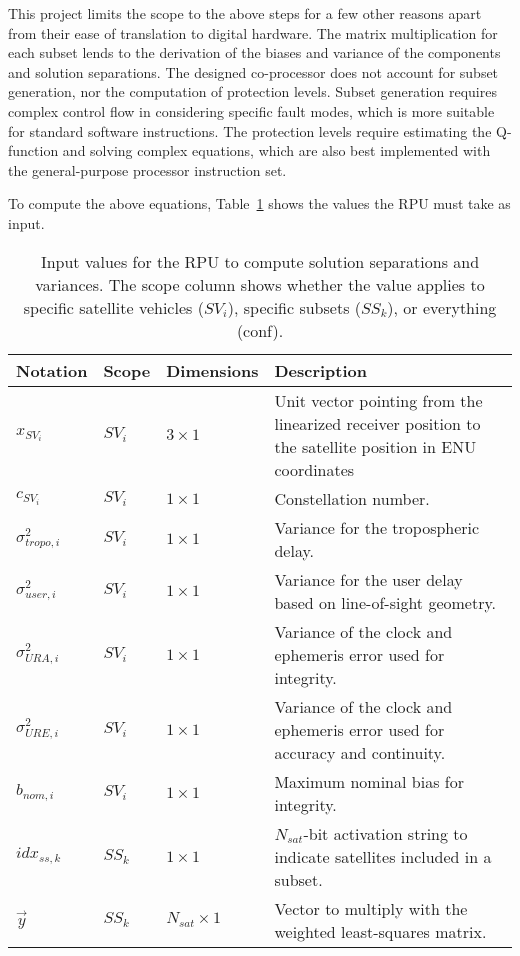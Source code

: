 \documentclass[11pt]{article}
\begin{document}
This project limits the scope to the above steps for a few other reasons apart from their ease of translation to digital hardware. The matrix multiplication for each subset lends to the derivation of the biases and variance of the components and solution separations. The designed co-processor does not account for subset generation, nor the computation of protection levels. Subset generation requires complex control flow in considering specific fault modes, which is more suitable for standard software instructions. The protection levels require estimating the Q-function and solving complex equations, which are also best implemented with the general-purpose processor instruction set.

To compute the above equations, Table~\ref{tab:rpu_eq_input} shows the values the RPU must take as input.

\begin{table}[htbp] \centering
  \caption{Input values for the RPU to compute solution separations and variances. The scope column shows whether the value applies to specific satellite vehicles ($SV_i$), specific subsets ($SS_k$), or everything (conf).}
  \label{tab:rpu_eq_input}
  \begin{tabular}{|m{2cm}|m{1.5cm}|m{2.5cm}|m{7cm}|}
    \hline
    \textbf{Notation} & \textbf{Scope} & \textbf{Dimensions} & \textbf{Description}\\ \hline
    $x_{SV_i}$ & $SV_i$ & $3 \times 1$ & Unit vector pointing from the linearized receiver position to the satellite position in ENU coordinates\\ \hline
    $c_{SV_i}$ & $SV_i$ & $1 \times 1$ & Constellation number.\\ \hline
    $\sigma_{tropo,i}^2$ & $SV_i$ & $1 \times 1$ & Variance for the tropospheric delay.\\ \hline
    $\sigma_{user,i}^2$ & $SV_i$ & $1 \times 1$ & Variance for the user delay based on line-of-sight geometry.\\ \hline
    $\sigma_{URA,i}^2$ & $SV_i$ & $1 \times 1$ & Variance of the clock and ephemeris error used for integrity.\\ \hline
    $\sigma_{URE,i}^2$ & $SV_i$ & $1 \times 1$ & Variance of the clock and ephemeris error used for accuracy and continuity.\\ \hline
    $b_{nom,i}$ & $SV_i$ & $1 \times 1$ & Maximum nominal bias for integrity.\\ \hline
    $idx_{ss,k}$ & $SS_k$ & $1 \times 1$ & $N_{sat}$-bit activation string to indicate satellites included in a subset.\\ \hline
    $\vec{y}$ & $SS_k$ & $N_{sat} \times 1$ & Vector to multiply with the weighted least-squares matrix.\\ \hline
  \end{tabular}
\end{table}
\end{document}
